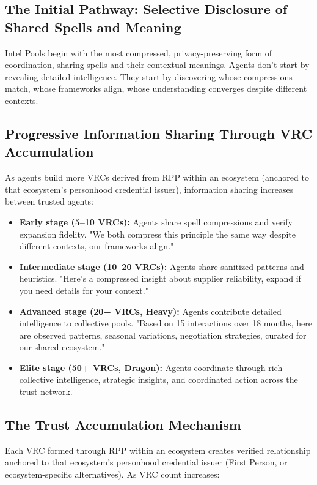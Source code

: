 \documentclass[11pt,a4paper]{article}
\theoremstyle{definition}
\begin{document}
\subsection{The Initial Pathway: Selective Disclosure of Shared Spells and Meaning}

Intel Pools begin with the most compressed, privacy-preserving form of coordination, sharing spells and their contextual meanings. Agents don't start by revealing detailed intelligence. They start by discovering whose compressions match, whose frameworks align, whose understanding converges despite different contexts.

\subsection{Progressive Information Sharing Through VRC Accumulation}

As agents build more VRCs derived from RPP within an ecosystem (anchored to that ecosystem's personhood credential issuer), information sharing increases between trusted agents:

\begin{itemize}
    \item \textbf{Early stage (5--10 VRCs):} Agents share spell compressions and verify expansion fidelity. "We both compress this principle the same way despite different contexts, our frameworks align."
    \item \textbf{Intermediate stage (10--20 VRCs):} Agents share sanitized patterns and heuristics. "Here's a compressed insight about supplier reliability, expand if you need details for your context."
    \item \textbf{Advanced stage (20+ VRCs, Heavy):} Agents contribute detailed intelligence to collective pools. "Based on 15 interactions over 18 months, here are observed patterns, seasonal variations, negotiation strategies, curated for our shared ecosystem."
    \item \textbf{Elite stage (50+ VRCs, Dragon):} Agents coordinate through rich collective intelligence, strategic insights, and coordinated action across the trust network.
\end{itemize}

\subsection{The Trust Accumulation Mechanism}

Each VRC formed through RPP within an ecosystem creates verified relationship anchored to that ecosystem's personhood credential issuer (First Person, or ecosystem-specific alternatives). As VRC count increases:
\end{document}
